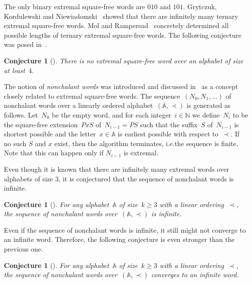 \documentclass[12pt]{article}
\theoremstyle{plain}
\newtheorem{conjecture}[theorem]{Conjecture}
\theoremstyle{definition}
\newcommand\N{\mathbb{N}}
\newcommand{\A}{\mathbb A}
\begin{document}
	The only binary extremal square-free words are $010$ and $101$. Grytczuk, Kordulewski and Niewiadomski~\cite{GrytczukKordulewskiNiewiadomski} showed that there are infinitely many ternary extremal square-free words. Mol and Rampersad~\cite{MolRampersad} concretely determined all possible lengths of ternary extremal square-free words. The following conjecture was posed in~\cite{GrytczukKordulewskiNiewiadomski,MolRampersad}.
	
	\begin{conjecture}[{\cite{GrytczukKordulewskiNiewiadomski,MolRampersad}}] \label{conj:no-extremal-squarefree-4}
		There is no extremal square-free word over an alphabet of size at least~$4$.
	\end{conjecture}
	
	The notion of \emph{nonchalant words} was introduced and discussed in~\cite{GrytczukKordulewskiNiewiadomski,GrytczukKordulewskiPawlik} as a concept closely related to extremal square-free words. The sequence~$(N_0,N_1,\dots)$ of nonchalant words over a linearly ordered alphabet~$(\A,\prec)$ is generated as follows. Let~$N_0$ be the empty word, and for each integer~$i\in\N$ we define~$N_i$ to be the square-free extension~$PxS$ of~$N_{i-1}=PS$ such that the suffix~$S$ of~$N_{i-1}$ is shortest possible and the letter~$x\in\A$ is earliest possible with respect to~$\prec$. If no such $S$ and $x$ exist, then the algorithm terminates, i.e.\@ the sequence is finite. Note that this can happen only if $N_{i-1}$ is extremal.
	
	Even though it is known that there are infinitely many extremal words over alphabets of size 3, it is conjectured that the sequence of nonchalant words is infinite.
	
	\begin{conjecture}[\cite{GrytczukKordulewskiNiewiadomski,GrytczukKordulewskiPawlik}]\label{conj:nonchalant-infinite}
		For any alphabet~$\A$ of size~$k\ge3$ with a linear ordering~$\prec$, the sequence of nonchalant words over~$(\A,\prec)$ is infinite.
	\end{conjecture}
	
	Even if the sequence of nonchalant words is infinite, it still might not converge to an infinite word. Therefore, the following conjecture is even stronger than the previous one.
	
	\begin{conjecture}[\cite{GrytczukKordulewskiNiewiadomski,GrytczukKordulewskiPawlik}] \label{conj:nonchalant-convergence-3}
		For any alphabet~$\A$ of size~$k\ge3$ with a linear ordering~$\prec$, the sequence of nonchalant words over~$(\A,\prec)$ converges to an infinite word.
	\end{conjecture}
	
\end{document}
